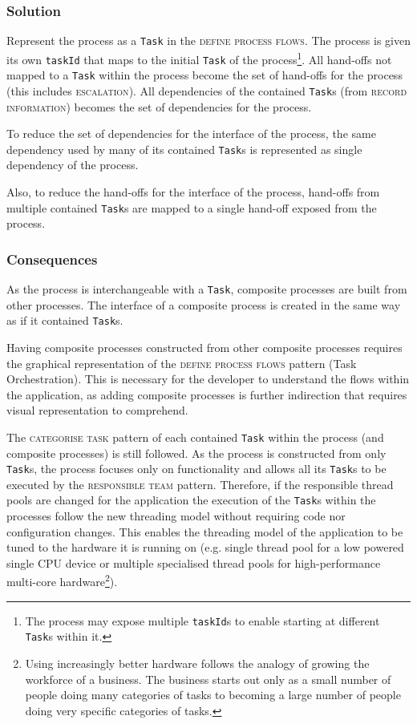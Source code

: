 \documentclass[prodmode]{style/acmlarge}
\begin{document}
\subsubsection*{\textbf{Solution}} Represent the process as a \texttt{Task} in the
\textsc{define process flows}.  The process is given its own \texttt{taskId}
that maps to the initial \texttt{Task} of the process\footnote{The process may
expose multiple \texttt{taskId}s to enable starting at different \texttt{Task}s
within it.}.  All hand-offs not mapped to a \texttt{Task} within the process
become the set of hand-offs for the process (this includes \textsc{escalation}).
All dependencies of the contained \texttt{Task}s (from \textsc{record
information}) becomes the set of dependencies for the process.

To reduce the set of dependencies for the interface of the process, the same
dependency used by many of its contained \texttt{Task}s is represented as single
dependency of the process.

Also, to reduce the hand-offs for the interface of the process, hand-offs
from multiple contained \texttt{Task}s are mapped to a single hand-off exposed
from the process.

\subsubsection*{Consequences} As the process is interchangeable with a
\texttt{Task}, composite processes are built from other processes.  The
interface of a composite process is created in the same way as if it contained
\texttt{Task}s.

Having composite processes constructed from other composite processes requires
the graphical representation of the \textsc{define process flows} pattern (Task
Orchestration).  This is necessary for the developer to understand the flows
within the application, as adding composite processes is further indirection
that requires visual representation to comprehend.

The \textsc{categorise task} pattern of each contained \texttt{Task} within the
process (and composite processes) is still followed.  As the process is
constructed from only \texttt{Task}s, the process focuses only on functionality
and allows all its \texttt{Task}s to be executed by the \textsc{responsible
team} pattern.  Therefore, if the responsible thread pools are changed for the
application the execution of the \texttt{Task}s within the processes follow the new
threading model without requiring code nor configuration changes.  This enables
the threading model of the application to be tuned to the hardware it is running
on (e.g. single thread pool for a low powered single CPU device or multiple
specialised thread pools for high-performance multi-core hardware\footnote{Using
increasingly better hardware follows the analogy of growing the workforce of a
business.  The business starts out only as a small number of people doing many
categories of tasks to becoming a large number of people doing very specific
categories of tasks.}).
\end{document}
